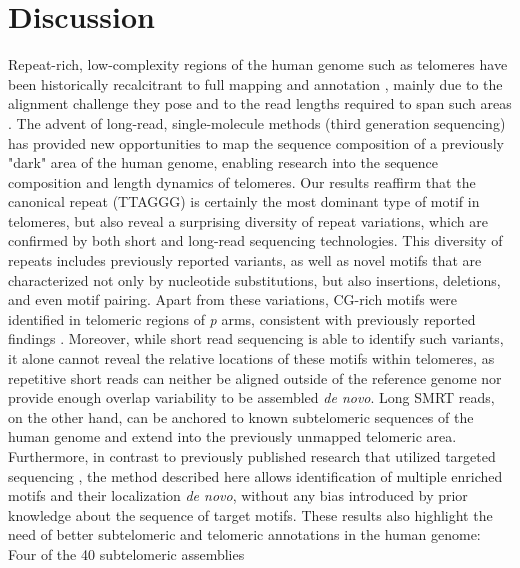 \documentclass{article}
\begin{document}
\section*{Discussion}  \label{sec:discussion}
    Repeat-rich, low-complexity regions of the human genome such as telomeres
        have been historically recalcitrant to full mapping and annotation \cite{miga2015},
        mainly due to the alignment challenge they pose and to the read lengths required to span such areas \cite{ngslowcomplexity}.
    The advent of long-read, single-molecule methods (third generation sequencing)
        has provided new opportunities to map the sequence composition of a previously "dark" area of the human genome,
        enabling research into the sequence composition and length dynamics \cite{luxton2020} of telomeres.
    Our results reaffirm
        that the canonical repeat (TTAGGG) is certainly the most dominant type of motif in telomeres,
        but also reveal a surprising diversity of repeat variations,
            which are confirmed by both short and long-read sequencing technologies.
    This diversity of repeats includes previously reported variants,
        as well as novel motifs that are characterized not only by nucleotide substitutions,
        but also insertions, deletions, and even motif pairing.
    Apart from these variations,
        CG-rich motifs were identified in telomeric regions of \textit{p} arms,
        consistent with previously reported findings \cite{cpg}.
    Moreover, while short read sequencing is able to identify such variants,
        it alone cannot reveal the relative locations of these motifs within telomeres,
        as repetitive short reads can
            neither be aligned outside of the reference genome
            nor provide enough overlap variability to be assembled \textit{de novo}.
    Long SMRT reads, on the other hand,
        can be anchored to known subtelomeric sequences of the human genome and extend into the previously unmapped telomeric area.
    Furthermore, in contrast to previously published research that utilized targeted sequencing
        \cite{telovars1989,telovars1999,telovars2018,telovars2019},
        the method described here allows identification of multiple enriched motifs and their localization
            \textit{de novo}, without any bias introduced by prior knowledge about the sequence of target motifs.
    These results also highlight the need of better subtelomeric and telomeric annotations in the human genome:
    Four of the 40 subtelomeric assemblies \cite{riethman2014}
\end{document}
